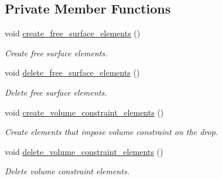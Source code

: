 \subsection*{Private Member Functions}
\begin{DoxyCompactItemize}
\item 
void \hyperlink{classDropInChannelProblem_a73b989e3bedbd3630f576b0dba0f724f}{create\+\_\+free\+\_\+surface\+\_\+elements} ()
\begin{DoxyCompactList}\small\item\em Create free surface elements. \end{DoxyCompactList}\item 
void \hyperlink{classDropInChannelProblem_a4463a1b341429f5a2c84a493aabb3a14}{delete\+\_\+free\+\_\+surface\+\_\+elements} ()
\begin{DoxyCompactList}\small\item\em Delete free surface elements. \end{DoxyCompactList}\item 
void \hyperlink{classDropInChannelProblem_a53b96cd50b4e6c9bee294b8fb7dd51bd}{create\+\_\+volume\+\_\+constraint\+\_\+elements} ()
\begin{DoxyCompactList}\small\item\em Create elements that impose volume constraint on the drop. \end{DoxyCompactList}\item 
void \hyperlink{classDropInChannelProblem_aec42cdf762f8b64c064db84df7f40f0a}{delete\+\_\+volume\+\_\+constraint\+\_\+elements} ()
\begin{DoxyCompactList}\small\item\em Delete volume constraint elements. \end{DoxyCompactList}\end{DoxyCompactItemize}
